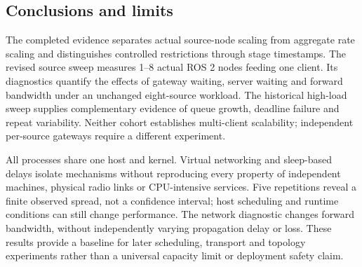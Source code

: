 \subsection{Conclusions and limits}

The completed evidence separates actual source-node scaling from aggregate rate scaling and distinguishes controlled restrictions through stage timestamps. The revised source sweep measures 1--8 actual ROS 2 nodes feeding one client. Its diagnostics quantify the effects of gateway waiting, server waiting and forward bandwidth under an unchanged eight-source workload. The historical high-load sweep supplies complementary evidence of queue growth, deadline failure and repeat variability. Neither cohort establishes multi-client scalability; independent per-source gateways require a different experiment.

All processes share one host and kernel. Virtual networking and sleep-based delays isolate mechanisms without reproducing every property of independent machines, physical radio links or CPU-intensive services. Five repetitions reveal a finite observed spread, not a confidence interval; host scheduling and runtime conditions can still change performance. The network diagnostic changes forward bandwidth, without independently varying propagation delay or loss. These results provide a baseline for later scheduling, transport and topology experiments rather than a universal capacity limit or deployment safety claim.
